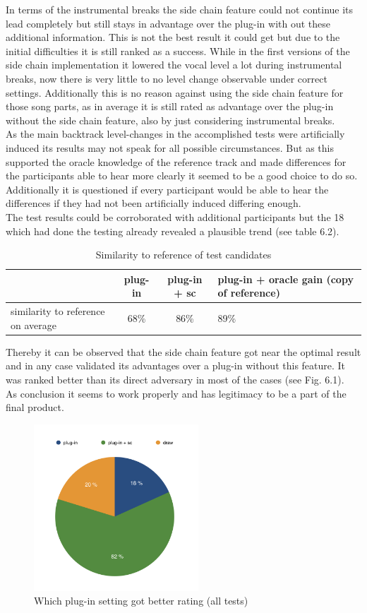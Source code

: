 In terms of the instrumental breaks the side chain feature could not continue its lead completely but still stays in advantage over the plug-in with out these additional information. This is not the best result it could get but due to the initial difficulties it is still ranked as a success. While in the first versions of the side chain implementation it lowered the vocal level a lot during instrumental breaks, now there is very little to no level change observable under correct settings. Additionally this is no reason against using the side chain feature for those song parts, as in average it is still rated as advantage over the plug-in without the side chain feature, also by just considering instrumental breaks.\\
As the main backtrack level-changes in the accomplished tests were artificially induced its results may not speak for all possible circumstances. But as this supported the oracle knowledge of the reference track and made differences for the participants able to hear more clearly it seemed to be a good choice to do so. Additionally it is questioned if every participant would be able to hear the differences if they had not been artificially induced differing enough.\\
The test results could be corroborated with additional participants but the 18 which had done the testing already revealed a plausible trend (see table 6.2).\\

\begin{table}[H]
\centering
	\begin{tabular}{ p{4cm} | c | c | p{4cm} }
		& plug-in & plug-in + sc & plug-in + oracle gain (copy of reference) \\ \hline
		similarity to reference on average & 68\% & 86\% & 89\% \\
	\end{tabular}
	\caption{Similarity to reference of test candidates}
\end{table}

Thereby it can be observed that the side chain feature got near the optimal result and in any case validated its advantages over a plug-in without this feature. It was ranked better than its direct adversary in most of the cases (see Fig. 6.1).\\
As conclusion it seems to work properly and has legitimacy to be a part of the final product.\\

\begin{figure}[H]
\includegraphics[width=0.55\textwidth]{images/betterRating}
\centering
\caption{Which plug-in setting got better rating (all tests)}
\end{figure}

